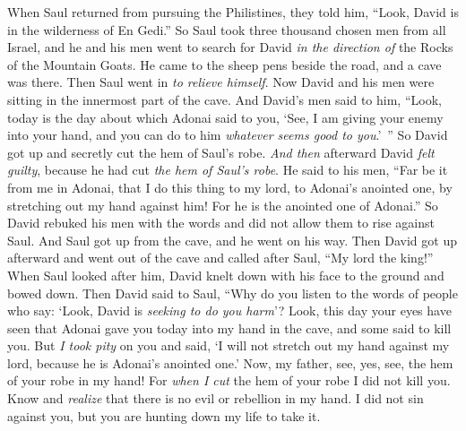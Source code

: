 \begin{biblechapter} %
 When Saul returned from pursuing the Philistines, they told him, “Look, David is in the wilderness of En Gedi.”
\verse So Saul took three thousand chosen men from all Israel, and he and his men went to search for David \textit{in the direction of} the Rocks of the Mountain Goats.
\verse He came to the sheep pens beside the road, and a cave was there. Then Saul went in \textit{to relieve himself}. Now David and his men were sitting in the innermost part of the cave.
\verse And David’s men said to him, “Look, today is the day about which Adonai said to you, ‘See, I am giving your enemy into your hand, and you can do to him \textit{whatever seems good to you}.’ ” So David got up and secretly cut the hem of Saul’s robe.
\verse \textit{And then} afterward David \textit{felt guilty}, because he had cut \textit{the hem of Saul’s robe}.
\verse He said to his men, “Far be it from me in Adonai, that I do this thing to my lord, to Adonai’s anointed one, by stretching out my hand against him! For he is the anointed one of Adonai.”
\verse So David rebuked his men with the words and did not allow them to rise against Saul. And Saul got up from the cave, and he went on his way.
\verse Then David got up afterward and went out of the cave and called after Saul, “My lord the king!” When Saul looked after him, David knelt down with his face to the ground and bowed down.
\verse Then David said to Saul, “Why do you listen to the words of people who say: ‘Look, David is \textit{seeking to do you harm}’?
\verse Look, this day your eyes have seen that Adonai gave you today into my hand in the cave, and some said to kill you. But \textit{I took pity} on you and said, ‘I will not stretch out my hand against my lord, because he is Adonai’s anointed one.’
\verse Now, my father, see, yes, see, the hem of your robe in my hand! For \textit{when I cut} the hem of your robe I did not kill you. Know and \textit{realize} that there is no evil or rebellion in my hand. I did not sin against you, but you are hunting down my life to take it.

\end{biblechapter}
